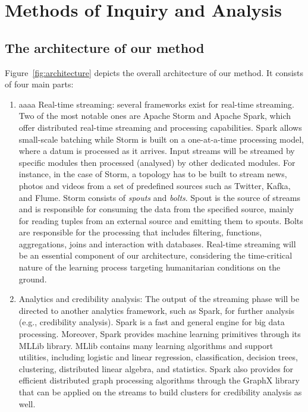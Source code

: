 \section{Methods of Inquiry and Analysis}

\subsection{The architecture of our method}

Figure~\ref{fig:architecture} depicts the overall architecture of our method. It consists of four main parts:
\begin{enumerate}
\item aaaa 
  Real-time streaming: several frameworks exist for real-time streaming. Two of the most notable ones are Apache Storm and Apache Spark, which offer distributed real-time streaming and processing capabilities. Spark allows small-scale batching while Storm is built on a one-at-a-time processing model, where a datum is processed as it arrives. Input streams will be streamed by specific modules then processed (analysed) by other dedicated modules. For instance, in the case of Storm, a topology has to be built to stream news, photos and videos from a set of predefined sources such as Twitter, Kafka, and Flume. Storm consists of \emph{spouts} and \emph{bolts}. Spout is the source of streams and is responsible for consuming the data from the specified source, mainly for reading tuples from an external source and emitting them to spouts. Bolts are responsible for the processing that includes filtering, functions, aggregations, joins and interaction with databases. Real-time streaming will be an essential component of our architecture, considering the time-critical nature of the learning process targeting humanitarian conditions on the ground.

\item Analytics and credibility analysis: The output of the streaming phase will be directed to another analytics framework, such as Spark, for further analysis (e.g., credibility analysis). Spark is a fast and general engine for big data processing. Moreover, Spark provides machine learning primitives through its MLLib library. MLlib contains many learning algorithms and support utilities, including logistic and linear regression, classification, decision trees, clustering, distributed linear algebra, and statistics. Spark also provides for efficient distributed graph processing algorithms through the GraphX library that can be applied on the streams to build clusters for credibility analysis as well. 


\end{enumerate}
